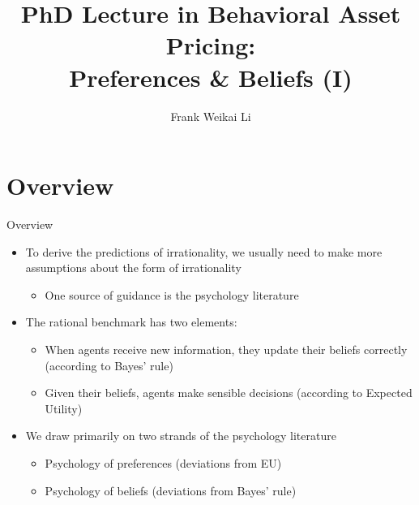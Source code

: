 \documentclass[aspectratio=169, 11pt]{beamer}
\title[EF8083 Lecture 3]{PhD Lecture in Behavioral Asset Pricing:\\ Preferences \& Beliefs (I)}
\author[F.\ W.\ Li]{Frank Weikai Li}
\institute[CityU]{Associate Professor of Finance\\City University of Hong Kong}
\date{}
\begin{document}

\begin{frame}[plain]
\titlepage
\end{frame}

\section{Overview}

\begin{frame}{Overview}
\begin{itemize}
\item To derive the predictions of irrationality, we usually need to make more assumptions about the form of irrationality
  \begin{itemize}
  \item One source of guidance is the psychology literature
  \end{itemize}
\item The rational benchmark has two elements:
  \begin{itemize}
  \item When agents receive new information, they update their beliefs correctly (according to Bayes' rule)
  \item Given their beliefs, agents make sensible decisions (according to Expected Utility)
  \end{itemize}
\item We draw primarily on two strands of the psychology literature
  \begin{itemize}
  \item Psychology of preferences (deviations from EU)
  \item Psychology of beliefs (deviations from Bayes' rule)
  \end{itemize}
\end{itemize}
\end{frame}
\end{document}
